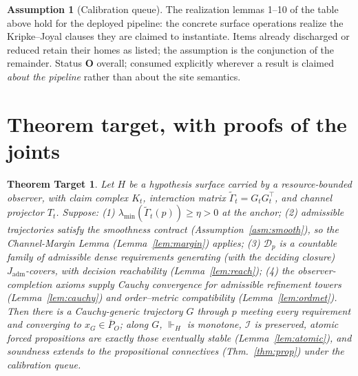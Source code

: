 \documentclass[11pt]{article}
\newtheorem*{theoremtarget}{Theorem Target}
\theoremstyle{definition}
\newtheorem{assumption}{Assumption}
\theoremstyle{remark}
\newcommand{\forcesH}{\Vdash_{H}}
\newcommand{\Gam}{\tilde{\Gamma}}
\newcommand{\lmin}{\lambda_{\min}}
\newcommand{\Kt}{K_{t}}
\newcommand{\Jadm}{J_{\mathrm{adm}}}
\begin{document}
\begin{assumption}[Calibration queue]\label{asm:calibration}
The realization lemmas 1--10 of the table above hold for the deployed pipeline: the concrete
surface operations realize the Kripke--Joyal clauses they are claimed to instantiate. Items already
discharged or reduced retain their homes as listed; the assumption is the conjunction of the
remainder. Status \textbf{O} overall; consumed explicitly wherever a result is claimed \emph{about
the pipeline} rather than about the site semantics.
\end{assumption}

\section{Theorem target, with proofs of the joints}\label{sec:target}

\begin{theoremtarget}
Let $H$ be a hypothesis surface carried by a resource-bounded observer, with claim complex $\Kt$,
interaction matrix $\Gam_t=G_tG_t^{\top}$, and channel projector $T_t$. Suppose: (1)
$\lmin(\Gam_t(p))\ge\eta>0$ at the anchor; (2) admissible trajectories satisfy the smoothness
contract (Assumption~\ref{asm:smooth}), so the Channel-Margin Lemma
(Lemma~\ref{lem:margin}) applies; (3) $\mathcal{D}_p$ is a countable family of admissible dense requirements
generating (with the deciding closure) $\Jadm$-covers, with decision reachability
(Lemma~\ref{lem:reach}); (4) the observer-completion axioms supply Cauchy convergence for admissible
refinement towers (Lemma~\ref{lem:cauchy}) and order--metric compatibility (Lemma~\ref{lem:ordmet}).
Then there is a Cauchy-generic trajectory $G$ through $p$ meeting every requirement and converging to
$x_G\in\overline{P}_O$; along $G$, $\forcesH$ is monotone, $\mathcal{I}$ is preserved, atomic forced
propositions are exactly those eventually stable (Lemma~\ref{lem:atomic}), and soundness extends to
the propositional connectives (Thm.~\ref{thm:prop}) under the calibration queue.
\end{theoremtarget}
\end{document}
